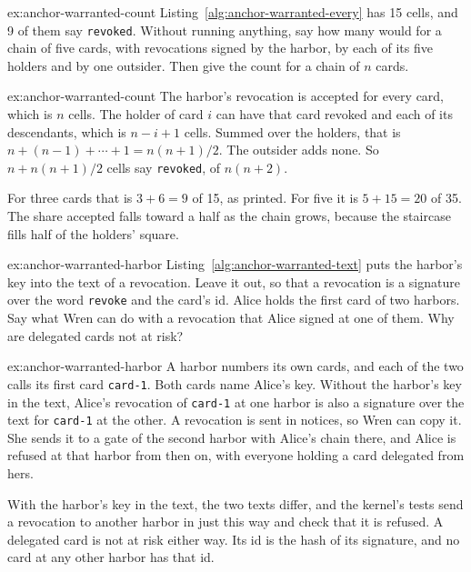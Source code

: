 \documentclass[11pt,a4paper]{article}
\theoremstyle{definition}
\begin{document}

\begin{pdexercise}[kind=Check,rating=1]{ex:anchor-warranted-count}
Listing~\ref{alg:anchor-warranted-every} has 15 cells, and 9 of them say \texttt{revoked}. Without running anything, say how many would for a chain of five cards, with revocations signed by the harbor, by each of its five holders and by one outsider. Then give the count for a chain of $n$ cards.
\end{pdexercise}
\begin{pdsolution}{ex:anchor-warranted-count}
The harbor's revocation is accepted for every card, which is $n$ cells. The holder of card $i$ can have that card revoked and each of its descendants, which is $n-i+1$ cells. Summed over the holders, that is $n+(n-1)+\cdots+1=n(n+1)/2$. The outsider adds none. So $n+n(n+1)/2$ cells say \texttt{revoked}, of $n(n+2)$.

For three cards that is $3+6=9$ of 15, as printed. For five it is $5+15=20$ of 35. The share accepted falls toward a half as the chain grows, because the staircase fills half of the holders' square.
\end{pdsolution}

\begin{pdexercise}[kind=Trace,rating=2]{ex:anchor-warranted-harbor}
Listing~\ref{alg:anchor-warranted-text} puts the harbor's key into the text of a revocation. Leave it out, so that a revocation is a signature over the word \texttt{revoke} and the card's id. Alice holds the first card of two harbors. Say what Wren can do with a revocation that Alice signed at one of them. Why are delegated cards not at risk?
\end{pdexercise}
\begin{pdsolution}{ex:anchor-warranted-harbor}
A harbor numbers its own cards, and each of the two calls its first card \texttt{card-1}. Both cards name Alice's key. Without the harbor's key in the text, Alice's revocation of \texttt{card-1} at one harbor is also a signature over the text for \texttt{card-1} at the other. A revocation is sent in notices, so Wren can copy it. She sends it to a gate of the second harbor with Alice's chain there, and Alice is refused at that harbor from then on, with everyone holding a card delegated from hers.

With the harbor's key in the text, the two texts differ, and the kernel's tests send a revocation to another harbor in just this way and check that it is refused. A delegated card is not at risk either way. Its id is the hash of its signature, and no card at any other harbor has that id.
\end{pdsolution}
\end{document}
